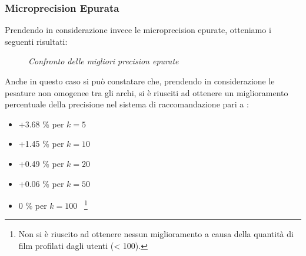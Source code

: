 \subsubsection{Microprecision Epurata}
Prendendo in considerazione invece le microprecision epurate, otteniamo i seguenti risultati:
\begin{figure}
	\caption{\emph{Confronto delle migliori precision epurate}}
\end{figure}

Anche in questo caso si può constatare che, prendendo in considerazione le pesature non omogenee tra gli archi, si è riusciti ad ottenere un miglioramento percentuale della precisione nel sistema di raccomandazione pari a :

\begin{itemize}
	\item +3.68 \% per $k = 5 $
	\item +1.45 \% per $k = 10 $
	\item +0.49 \% per $k = 20 $
	\item +0.06 \% per $k = 50 $
	\item 0 \% per $k = 100 $ ~\footnote{Non si è riuscito ad ottenere nessun miglioramento a causa della quantità di film profilati dagli utenti (< 100).}				
\end{itemize} 

